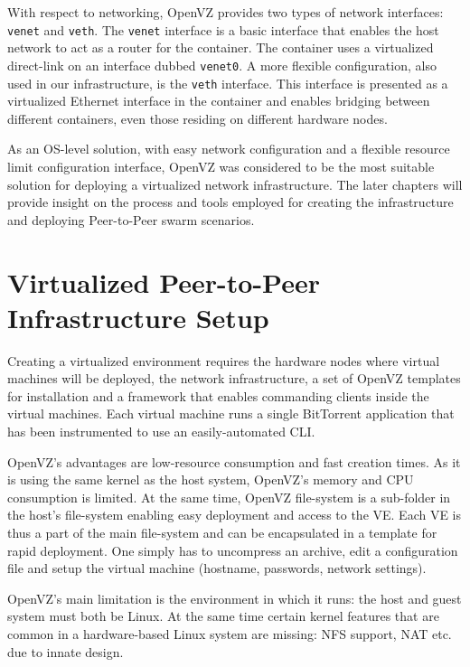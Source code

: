 With respect to networking, OpenVZ provides two types of network interfaces:
\texttt{venet} and \texttt{veth}. The \texttt{venet} interface is a basic
interface that enables the host network to act as a router for the container.
The container uses a virtualized direct-link on an interface dubbed
\texttt{venet0}. A more flexible configuration, also used in our
infrastructure, is the \texttt{veth} interface. This interface is presented as
a virtualized Ethernet interface in the container and enables bridging
between different containers, even those residing on different hardware nodes.

As an OS-level solution, with easy network configuration and a flexible
resource limit configuration interface, OpenVZ was considered to be the most
suitable solution for deploying a virtualized network infrastructure. The
later chapters will provide insight on the process and tools employed for
creating the infrastructure and deploying Peer-to-Peer swarm scenarios.

\section{Virtualized Peer-to-Peer Infrastructure Setup}
\label{sec:virt-infra:setup}

Creating a virtualized environment requires the hardware nodes where virtual
machines will be deployed, the network infrastructure, a set of OpenVZ
templates for installation and a framework that enables commanding clients
inside the virtual machines.  Each virtual machine runs a single BitTorrent
application that has been instrumented to use an easily-automated CLI.

OpenVZ's advantages are low-resource consumption and fast creation times. As
it is using the same kernel as the host system, OpenVZ's memory and CPU
consumption is limited. At the same time, OpenVZ file-system is a sub-folder
in the host's file-system enabling easy deployment and access to the VE. Each
VE is thus a part of the main file-system and can be encapsulated in a
template for rapid deployment. One simply has to uncompress an archive, edit a
configuration file and setup the virtual machine (hostname, passwords, network
settings).

OpenVZ's main limitation is the environment in which it runs: the host and
guest system must both be Linux. At the same time certain kernel features that
are common in a hardware-based Linux system are missing: NFS support, NAT etc.
due to innate design.

